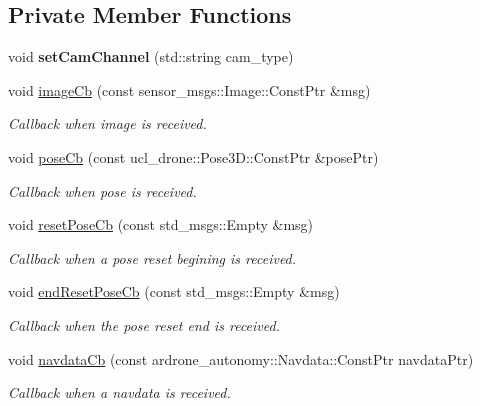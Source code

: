 \subsection*{Private Member Functions}
\begin{DoxyCompactItemize}
\item 
\mbox{\label{classImageProcessor_a2a0803b9dc88fbff9e9db2a36367dd68}} 
void {\bfseries set\+Cam\+Channel} (std\+::string cam\+\_\+type)
\item 
\mbox{\label{classImageProcessor_a800e26b296b48983699652d6147287af}} 
void \hyperlink{classImageProcessor_a800e26b296b48983699652d6147287af}{image\+Cb} (const sensor\+\_\+msgs\+::\+Image\+::\+Const\+Ptr \&msg)
\begin{DoxyCompactList}\small\item\em Callback when image is received. \end{DoxyCompactList}\item 
\mbox{\label{classImageProcessor_ad605030b64f4aadbe16253b0b32d4cdd}} 
void \hyperlink{classImageProcessor_ad605030b64f4aadbe16253b0b32d4cdd}{pose\+Cb} (const ucl\+\_\+drone\+::\+Pose3\+D\+::\+Const\+Ptr \&pose\+Ptr)
\begin{DoxyCompactList}\small\item\em Callback when pose is received. \end{DoxyCompactList}\item 
\mbox{\label{classImageProcessor_a8d473fde95f696d4705b7ee659e588de}} 
void \hyperlink{classImageProcessor_a8d473fde95f696d4705b7ee659e588de}{reset\+Pose\+Cb} (const std\+\_\+msgs\+::\+Empty \&msg)
\begin{DoxyCompactList}\small\item\em Callback when a pose reset begining is received. \end{DoxyCompactList}\item 
\mbox{\label{classImageProcessor_a76f4419e8a18cf8141d4ea565b248c7e}} 
void \hyperlink{classImageProcessor_a76f4419e8a18cf8141d4ea565b248c7e}{end\+Reset\+Pose\+Cb} (const std\+\_\+msgs\+::\+Empty \&msg)
\begin{DoxyCompactList}\small\item\em Callback when the pose reset end is received. \end{DoxyCompactList}\item 
\mbox{\label{classImageProcessor_a660ad0c87f07a4180349cc411020f6e1}} 
void \hyperlink{classImageProcessor_a660ad0c87f07a4180349cc411020f6e1}{navdata\+Cb} (const ardrone\+\_\+autonomy\+::\+Navdata\+::\+Const\+Ptr navdata\+Ptr)
\begin{DoxyCompactList}\small\item\em Callback when a navdata is received. \end{DoxyCompactList}\end{DoxyCompactItemize}
